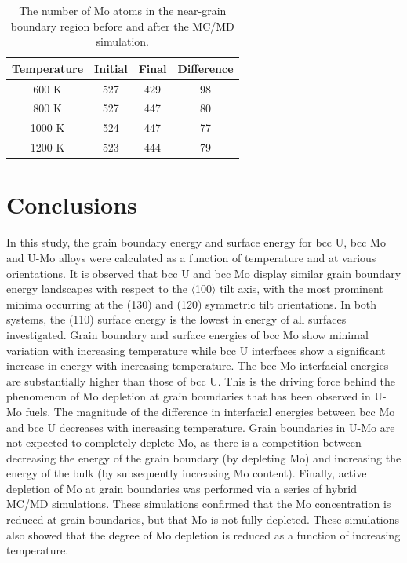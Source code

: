 \documentclass[review]{elsarticle}
\begin{document}
\begin{table}[h]
\caption{The number of Mo atoms in the near-grain boundary region before and after the MC/MD simulation. } \label{tab:mcmdtemp}
\begin{center}
\begin{tabular}{|c|c|c|c|}
	\hline
Temperature & Initial & Final & Difference \\
\hline
600 K & 527 & 429 & 98 \\
800 K & 527 & 447 & 80\\ 
1000 K & 524 & 447 & 77 \\
1200 K & 523 & 444 & 79 \\
 	 \hline
\end{tabular}
\end{center}
\label{default}
\end{table}

\FloatBarrier

\section{Conclusions}

In this study, the grain boundary energy and surface energy for bcc U, bcc Mo and U-Mo alloys were calculated as a function of temperature and at various orientations. It is observed that bcc U and bcc Mo display similar grain boundary energy landscapes with respect to the $\langle$100$\rangle$ tilt axis, with the most prominent minima occurring at the (130) and (120) symmetric tilt orientations. In both systems, the (110) surface energy is the lowest in energy of all surfaces investigated. Grain boundary and surface energies of bcc Mo show minimal variation with increasing temperature while bcc U interfaces show a significant increase in energy with increasing temperature. The bcc Mo interfacial energies are substantially higher than those of bcc U. This is the driving force behind the phenomenon of Mo depletion at grain boundaries that has been observed in U-Mo fuels. The magnitude of the difference in interfacial energies between bcc Mo and bcc U decreases with increasing temperature. Grain boundaries in U-Mo are not expected to completely deplete Mo, as there is a competition between decreasing the energy of the grain boundary (by depleting Mo) and increasing the energy of the bulk (by subsequently increasing Mo content). Finally, active depletion of Mo at grain boundaries was performed via a series of hybrid MC/MD simulations. These simulations confirmed that the Mo concentration is reduced at grain boundaries, but that Mo is not fully depleted. These simulations also showed that the degree of Mo depletion is reduced as a function of increasing temperature. 
\end{document}
